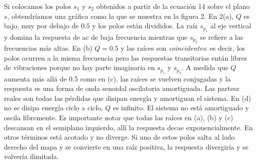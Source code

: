 \documentclass{article}
\begin{document}
Si colocamos los polos $s_1$ y $s_2$ obtenidos a partir de la ecuación 14 sobre el plano $s$, obtendríamos una gráfica como la que se muestra en la figura 2. En 2(a), $Q$ es bajo, muy por debajo de $0.5$ y los polos están divididos. La raíz $s_{p_1}$ al eje vertical y domina la respuesta de ac de baja frecuencia mientras que $s_{p_2}$ se refiere a las frecuencias más altas. En (b) $Q=0.5$ y las raíces son \textit{coincidentes}: es decir, los polos ocurren a la misma frecuencia pero las respuestas transitorias entán libres de vibraciones porque no hay parte imaginaria en $s_{p_1}$ y $s_{p_2}$.
A medida que $Q$ aumenta más allá de 0.5 como en (c), las raíces se vuelven conjugadas y la respuesta es una forma de onda senoidal oscilatoria amortiguada. Las partesz reales son todas las pérdidas que disipan energía y amortiguan el sistema. En (d) no se disipa energía ciclo a ciclo, $Q$ es infinito. El sistema no está amortiguado y oscila libremente.
Es importante notar que todas las raíces en (a), (b) y (c) descansan en el semiplano izquierdo, allí la respuesta decae exponencialmente. En otros términos está acotado y no diverge. Si uno de estos polos salta al lado derecho del mapa y se convierte en una raíz positiva, la respuesta divergiría y se volvería ilimitada.
\end{document}
